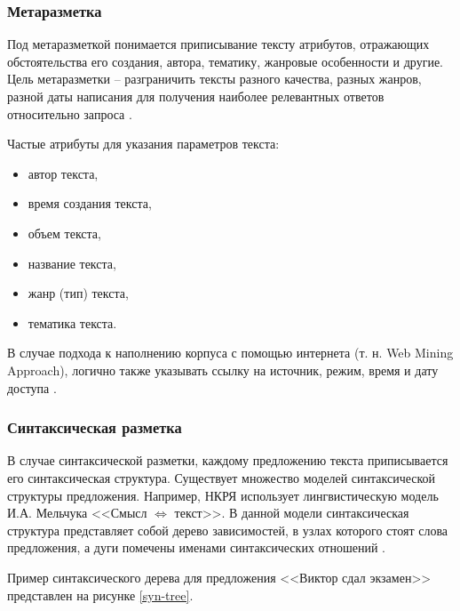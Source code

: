 \subsubsection{Метаразметка}

Под метаразметкой понимается приписывание тексту атрибутов, отражающих обстоятельства его создания, автора, тематику, жанровые особенности и другие. 
Цель метаразметки -- разграничить тексты разного качества, разных жанров, разной даты написания для получения наиболее релевантных ответов относительно запроса \cite{annotation-russian}.

Частые атрибуты для указания параметров текста:

\begin{itemize}[label=---]
	\item автор текста,

	\item время создания текста,

	\item объем текста,

	\item название текста,

	\item жанр (тип) текста,

	\item тематика текста.
\end{itemize}

В случае подхода к наполнению корпуса с помощью интернета (т. н. Web Mining Approach), логично также указывать ссылку на источник, режим, время и дату доступа \cite{khosla-survey-report-2018}.

\subsubsection{Синтаксическая разметка}

В случае синтаксической разметки, каждому предложению текста приписывается его синтаксическая структура. 
Существует множество моделей синтаксической структуры предложения. 
Например, НКРЯ использует лингвистическую модель И.А. Мельчука <<Смысл $\mathrel{\Leftrightarrow}$ текст>>. 
В данной модели синтаксическая структура представляет собой дерево зависимостей, в узлах которого стоят слова предложения, а дуги помечены именами синтаксических отношений \cite{annotation-russian}.

Пример синтаксического дерева для предложения <<Виктор сдал экзамен>> представлен на рисунке \ref{syn-tree}.

